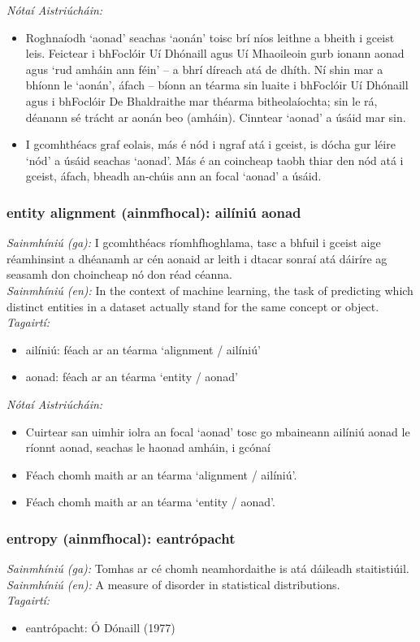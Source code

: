  \noindent \textit{Nótaí Aistriúcháin:}
\begin{itemize}
	\item Roghnaíodh `aonad' seachas `aonán' toisc brí níos leithne a bheith i gceist leis. Feictear i bhFoclóir Uí Dhónaill agus Uí Mhaoileoin gurb ionann aonad agus `rud amháin ann féin' -- a bhrí díreach atá de dhíth. Ní shin mar a bhíonn le `aonán', áfach -- bíonn an téarma sin luaite i bhFoclóir Uí Dhónaill agus i bhFoclóir De Bhaldraithe mar théarma bitheolaíochta; sin le rá, déanann sé trácht ar aonán beo (amháin). Cinntear `aonad' a úsáid mar sin.
	\item I gcomhthéacs graf eolais, más é nód i ngraf atá i gceist, is dócha gur léire `nód' a úsáid seachas `aonad'. Más é an coincheap taobh thiar den nód atá i gceist, áfach, bheadh an-chúis ann an focal `aonad' a úsáid.
\end{itemize}


\subsubsection*{entity alignment (ainmfhocal): ailíniú aonad}
 \noindent \textit{Sainmhíniú (ga):} I gcomhthéacs ríomhfhoghlama, tasc a bhfuil i gceist aige réamhinsint a dhéanamh ar cén aonaid ar leith i dtacar sonraí atá dáiríre ag seasamh don choincheap nó don réad céanna.
\\
 \noindent \textit{Sainmhíniú (en):} In the context of machine learning, the task of predicting which distinct entities in a dataset actually stand for the same concept or object.
\\
 \noindent \textit{Tagairtí:}
\begin{itemize}
	\item ailíniú: féach ar an téarma `alignment / ailíniú'
	\item aonad: féach ar an téarma `entity / aonad'
\end{itemize}

 \noindent \textit{Nótaí Aistriúcháin:}
\begin{itemize}
	\item Cuirtear san uimhir iolra an focal `aonad' tosc go mbaineann ailíniú aonad le ríonnt aonad, seachas le haonad amháin, i gcónaí
	\item Féach chomh maith ar an téarma `alignment / ailíniú'.
	\item Féach chomh maith ar an téarma `entity / aonad'.
\end{itemize}


\subsubsection*{entropy (ainmfhocal): eantrópacht}
 \noindent \textit{Sainmhíniú (ga):} Tomhas ar cé chomh neamhordaithe is atá dáileadh staitistiúil.
\\
 \noindent \textit{Sainmhíniú (en):} A measure of disorder in statistical distributions.
\\
 \noindent \textit{Tagairtí:}
\begin{itemize}
	\item eantrópacht: Ó Dónaill (1977) \cite{odonaill}
\end{itemize}

